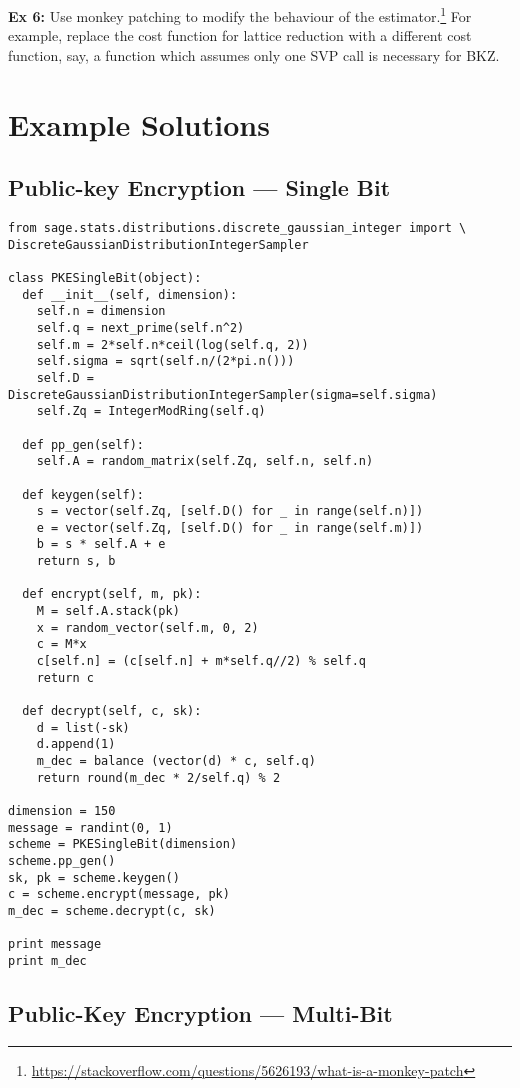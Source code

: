 \documentclass[10pt,a4paper,nobib]{tufte-handout}
\begin{document}
\textbf{Ex 6:} Use monkey patching to modify the behaviour of the estimator.\footnote{\url{https://stackoverflow.com/questions/5626193/what-is-a-monkey-patch}} For example, replace the cost function for lattice reduction with a different cost function, say, a function which assumes only one SVP call is necessary for BKZ.

\section{Example Solutions}

\subsection{Public-key Encryption --- Single Bit}

\lstset{language=sage,label= ,caption= ,captionpos=b,numbers=none}
\begin{lstlisting}
from sage.stats.distributions.discrete_gaussian_integer import \
DiscreteGaussianDistributionIntegerSampler

class PKESingleBit(object):
  def __init__(self, dimension):
    self.n = dimension
    self.q = next_prime(self.n^2)
    self.m = 2*self.n*ceil(log(self.q, 2))
    self.sigma = sqrt(self.n/(2*pi.n()))
    self.D = DiscreteGaussianDistributionIntegerSampler(sigma=self.sigma)
    self.Zq = IntegerModRing(self.q)

  def pp_gen(self):
    self.A = random_matrix(self.Zq, self.n, self.n)

  def keygen(self):
    s = vector(self.Zq, [self.D() for _ in range(self.n)])
    e = vector(self.Zq, [self.D() for _ in range(self.m)])
    b = s * self.A + e
    return s, b

  def encrypt(self, m, pk):
    M = self.A.stack(pk)
    x = random_vector(self.m, 0, 2)
    c = M*x 
    c[self.n] = (c[self.n] + m*self.q//2) % self.q
    return c

  def decrypt(self, c, sk):
    d = list(-sk)
    d.append(1)
    m_dec = balance (vector(d) * c, self.q)
    return round(m_dec * 2/self.q) % 2

dimension = 150
message = randint(0, 1)
scheme = PKESingleBit(dimension)
scheme.pp_gen()
sk, pk = scheme.keygen()
c = scheme.encrypt(message, pk)
m_dec = scheme.decrypt(c, sk)

print message
print m_dec
\end{lstlisting}

\subsection{Public-Key Encryption --- Multi-Bit}
\end{document}
